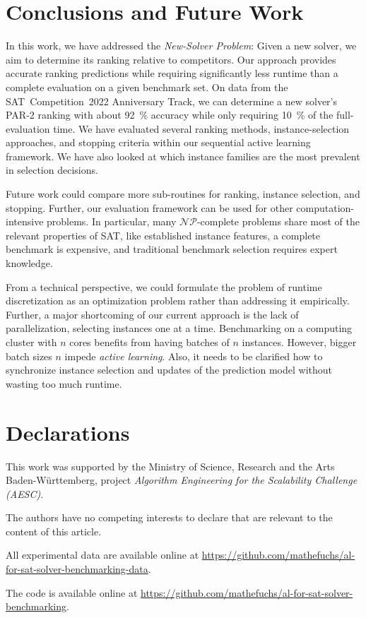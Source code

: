 \documentclass[sn-basic, Numbered]{sn-jnl} %
\begin{document}
\section{Conclusions and Future Work}
\label{sec:conclusion}

In this work, we have addressed the \emph{New-Solver Problem}:
Given a new solver, we aim to determine its ranking relative to competitors.
Our approach provides accurate ranking predictions while requiring significantly less runtime than a complete evaluation on a given benchmark set.
On data from the SAT~Competition~2022 Anniversary Track, we can determine a new solver's PAR-2 ranking with about \SI{92}{\%} accuracy while only requiring \SI{10}{\%} of the full-evaluation time.
We have evaluated several ranking methods, instance-selection approaches, and stopping criteria within our sequential active learning framework.
We have also looked at which instance families are the most prevalent in selection decisions.

Future work could compare more sub-routines for ranking, instance selection, and stopping.
Further, our evaluation framework can be used for other computation-intensive problems.
In particular, many $\mathcal{NP}$-complete problems share most of the relevant properties of SAT, like established instance features, a complete benchmark is expensive, and traditional benchmark selection requires expert knowledge.

From a technical perspective, we could formulate the problem of runtime discretization as an optimization problem rather than addressing it empirically.
Further, a major shortcoming of our current approach is the lack of parallelization, selecting instances one at a time.
Benchmarking on a computing cluster with $n$ cores benefits from having batches of $n$ instances.
However, bigger batch sizes $n$ impede \emph{active learning}.
Also, it needs to be clarified how to synchronize instance selection and updates of the prediction model without wasting too much runtime.

\backmatter

\section*{Declarations}


This work was supported by the Ministry of Science, Research and the Arts Baden-Württemberg, project \emph{Algorithm Engineering for the Scalability Challenge (AESC)}.


The authors have no competing interests to declare that are relevant to the content of this article.


All experimental data are available online at \url{https://github.com/mathefuchs/al-for-sat-solver-benchmarking-data}.


The code is available online at \url{https://github.com/mathefuchs/al-for-sat-solver-benchmarking}.


\end{document}

